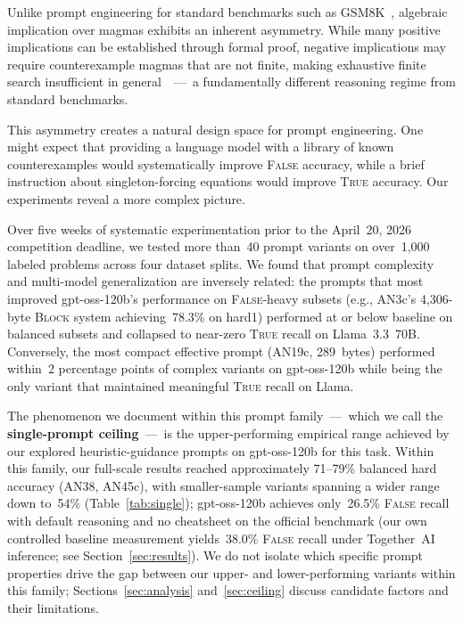 \documentclass[11pt]{article}
\begin{document}
Unlike prompt engineering for standard benchmarks such as
GSM8K~\citep{cobbe2021gsm8k}, algebraic implication over magmas
exhibits an inherent asymmetry. While many positive implications can
be established through formal proof, negative implications may
require counterexample magmas that are not finite, making exhaustive
finite search insufficient in general~\citep{tao2025etp}~---~a
fundamentally different reasoning regime from standard benchmarks.

This asymmetry creates a natural design space for prompt engineering.
One might expect that providing a language model with a library of known
counterexamples would systematically improve \textsc{False} accuracy,
while a brief instruction about singleton-forcing equations would
improve \textsc{True} accuracy. Our experiments reveal a more complex
picture.

Over five weeks of systematic experimentation prior to the April~20,
2026 competition deadline, we tested more than~40 prompt variants on
over~1{,}000 labeled problems across four dataset splits. We found that
prompt complexity and multi-model generalization are inversely related:
the prompts that most improved gpt-oss-120b's performance on
\textsc{False}-heavy subsets (e.g., AN3c's 4{,}306-byte \textsc{Block}
system achieving~78.3\% on hard1) performed at or below baseline on
balanced subsets and collapsed to near-zero \textsc{True} recall on
Llama~3.3~70B. Conversely, the most compact effective prompt (AN19c,
289~bytes) performed within~2 percentage points of complex variants on
gpt-oss-120b while being the only variant that maintained meaningful
\textsc{True} recall on Llama.

The phenomenon we document within this prompt family~---~which we call
the \textbf{single-prompt ceiling}~---~is the upper-performing empirical
range achieved by our explored heuristic-guidance prompts on
gpt-oss-120b for this task. Within this family, our full-scale results
reached approximately 71--79\% balanced hard accuracy (AN38, AN45c),
with smaller-sample variants spanning a wider range down to~54\%
(Table~\ref{tab:single}); gpt-oss-120b achieves only~26.5\%
\textsc{False} recall with default reasoning and no cheatsheet on the
official benchmark (our own controlled baseline measurement
yields~38.0\% \textsc{False} recall under Together~AI inference; see
Section~\ref{sec:results}). We do not isolate which specific prompt
properties drive the gap between our upper- and lower-performing
variants within this family; Sections~\ref{sec:analysis}
and~\ref{sec:ceiling} discuss candidate factors and their limitations.
\end{document}
